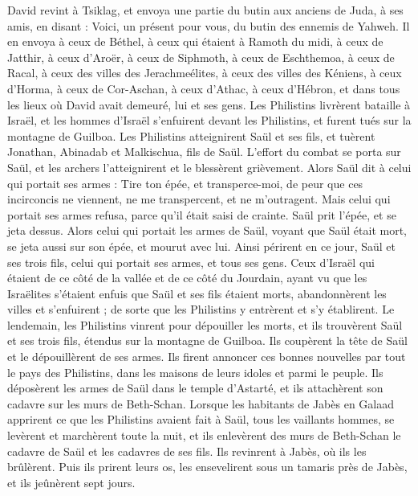 \begin{multicols}{2}
David revint à Tsiklag, et envoya une partie du butin aux anciens de Juda, à ses amis, en disant : Voici, un présent pour vous, du butin des ennemis de Yahweh.
Il en envoya à ceux de Béthel, à ceux qui étaient à Ramoth du midi, à ceux de Jatthir,
à ceux d’Aroër, à ceux de Siphmoth, à ceux de Eschthemoa,
à ceux de Racal, à ceux des villes des Jerachmeélites, à ceux des villes des Kéniens,
à ceux d’Horma, à ceux de Cor-Aschan, à ceux d’Athac,
à ceux d’Hébron, et dans tous les lieux où David avait demeuré, lui et ses gens.
\VerseOne{}Les Philistins livrèrent bataille à Israël, et les hommes d'Israël s'enfuirent devant les Philistins, et furent tués sur la montagne de Guilboa.
Les Philistins atteignirent Saül et ses fils, et tuèrent Jonathan, Abinadab et Malkischua, fils de Saül.
L’effort du combat se porta sur Saül, et les archers l’atteignirent et le blessèrent grièvement.
Alors Saül dit à celui qui portait ses armes : Tire ton épée, et transperce-moi, de peur que ces incirconcis ne viennent, ne me transpercent, et ne m’outragent. Mais celui qui portait ses armes refusa, parce qu'il était saisi de crainte. Saül prit l'épée, et se jeta dessus.
Alors celui qui portait les armes de Saül, voyant que Saül était mort, se jeta aussi sur son épée, et mourut avec lui.
Ainsi périrent en ce jour, Saül et ses trois fils, celui qui portait ses armes, et tous ses gens.
Ceux d'Israël qui étaient de ce côté de la vallée et de ce côté du Jourdain, ayant vu que les Israëlites s'étaient enfuis que Saül et ses fils étaient morts, abandonnèrent les villes et s'enfuirent ; de sorte que les Philistins y entrèrent et s’y établirent.
Le lendemain, les Philistins vinrent pour dépouiller les morts, et ils trouvèrent Saül et ses trois fils, étendus sur la montagne de Guilboa.
Ils coupèrent la tête de Saül et le dépouillèrent de ses armes. Ils firent annoncer ces bonnes nouvelles par tout le pays des Philistins, dans les maisons de leurs idoles et parmi le peuple.
Ils déposèrent les armes de Saül dans le temple d’Astarté, et ils attachèrent son cadavre sur les murs de Beth-Schan.
Lorsque les habitants de Jabès en Galaad apprirent ce que les Philistins avaient fait à Saül,
tous les vaillants hommes, se levèrent et marchèrent toute la nuit, et ils enlevèrent des murs de Beth-Schan le cadavre de Saül et les cadavres de ses fils. Ils revinrent à Jabès, où ils les brûlèrent.
Puis ils prirent leurs os, les ensevelirent sous un tamaris près de Jabès, et ils jeûnèrent sept jours.
\PPE{}
\end{multicols}
